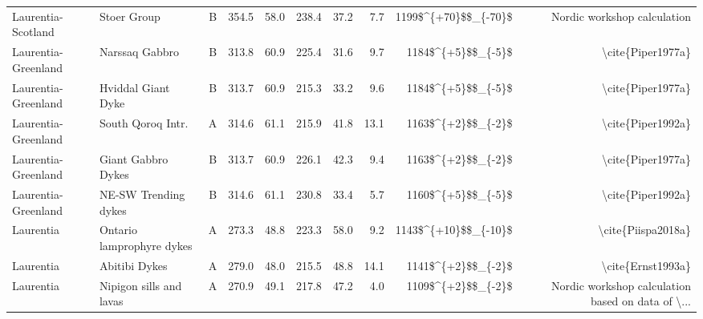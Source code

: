 \begin{longtable}{p{1 in}p{1 in}rrrrrrrr}
            Laurentia-Scotland &                                      Stoer Group &      B &     354.5 &      58.0 & 238.4 &  37.2 &       7.7 &   1199\$\textasciicircum \{+70\}\$\$\_\{-70\}\$ &                        Nordic workshop calculation \\
           Laurentia-Greenland &                                   Narssaq Gabbro &      B &     313.8 &      60.9 & 225.4 &  31.6 &       9.7 &     1184\$\textasciicircum \{+5\}\$\$\_\{-5\}\$ &                                  \textbackslash cite\{Piper1977a\} \\
           Laurentia-Greenland &                               Hviddal Giant Dyke &      B &     313.7 &      60.9 & 215.3 &  33.2 &       9.6 &     1184\$\textasciicircum \{+5\}\$\$\_\{-5\}\$ &                                  \textbackslash cite\{Piper1977a\} \\
           Laurentia-Greenland &                                South Qoroq Intr. &      A &     314.6 &      61.1 & 215.9 &  41.8 &      13.1 &     1163\$\textasciicircum \{+2\}\$\$\_\{-2\}\$ &                                  \textbackslash cite\{Piper1992a\} \\
           Laurentia-Greenland &                               Giant Gabbro Dykes &      B &     313.7 &      60.9 & 226.1 &  42.3 &       9.4 &     1163\$\textasciicircum \{+2\}\$\$\_\{-2\}\$ &                                  \textbackslash cite\{Piper1977a\} \\
           Laurentia-Greenland &                             NE-SW Trending dykes &      B &     314.6 &      61.1 & 230.8 &  33.4 &       5.7 &     1160\$\textasciicircum \{+5\}\$\$\_\{-5\}\$ &                                  \textbackslash cite\{Piper1992a\} \\
                     Laurentia &                        Ontario lamprophyre dykes &      A &     273.3 &      48.8 & 223.3 &  58.0 &       9.2 &   1143\$\textasciicircum \{+10\}\$\$\_\{-10\}\$ &                                 \textbackslash cite\{Piispa2018a\} \\
                     Laurentia &                                    Abitibi Dykes &      A &     279.0 &      48.0 & 215.5 &  48.8 &      14.1 &     1141\$\textasciicircum \{+2\}\$\$\_\{-2\}\$ &                                  \textbackslash cite\{Ernst1993a\} \\
                     Laurentia &                          Nipigon sills and lavas &      A &     270.9 &      49.1 & 217.8 &  47.2 &       4.0 &     1109\$\textasciicircum \{+2\}\$\$\_\{-2\}\$ &  Nordic workshop calculation based on data of \textbackslash ... \\

\end{longtable}
